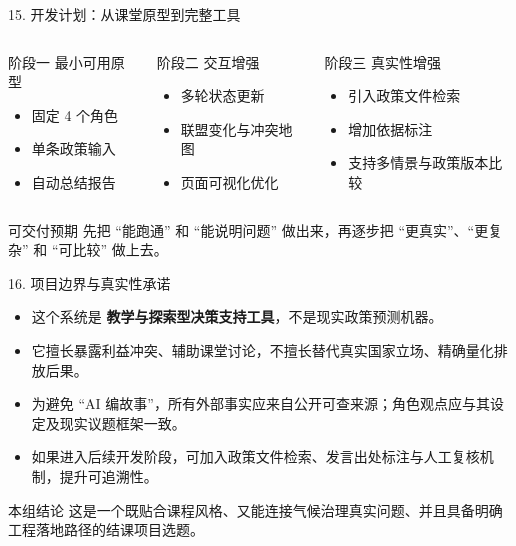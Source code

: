 \documentclass[aspectratio=169,10.5pt]{ctexbeamer}
\begin{document}
\begin{frame}{15. 开发计划：从课堂原型到完整工具}
  \begin{columns}[T]
    \begin{block}{阶段一}
      最小可用原型
      \begin{itemize}
        \item 固定 4 个角色
        \item 单条政策输入
        \item 自动总结报告
      \end{itemize}
    \end{block}
    \begin{block}{阶段二}
      交互增强
      \begin{itemize}
        \item 多轮状态更新
        \item 联盟变化与冲突地图
        \item 页面可视化优化
      \end{itemize}
    \end{block}
    \begin{block}{阶段三}
      真实性增强
      \begin{itemize}
        \item 引入政策文件检索
        \item 增加依据标注
        \item 支持多情景与政策版本比较
      \end{itemize}
    \end{block}
  \end{columns}
  \begin{alertblock}{可交付预期}
    先把 ``能跑通'' 和 ``能说明问题'' 做出来，再逐步把 ``更真实''、``更复杂'' 和 ``可比较'' 做上去。
  \end{alertblock}
\end{frame}

\begin{frame}{16. 项目边界与真实性承诺}
  \begin{itemize}
    \item 这个系统是 \textbf{教学与探索型决策支持工具}，不是现实政策预测机器。
    \item 它擅长暴露利益冲突、辅助课堂讨论，不擅长替代真实国家立场、精确量化排放后果。
    \item 为避免 ``AI 编故事''，所有外部事实应来自公开可查来源；角色观点应与其设定及现实议题框架一致。
    \item 如果进入后续开发阶段，可加入政策文件检索、发言出处标注与人工复核机制，提升可追溯性。
  \end{itemize}
  \begin{alertblock}{本组结论}
    这是一个既贴合课程风格、又能连接气候治理真实问题、并且具备明确工程落地路径的结课项目选题。
  \end{alertblock}
\end{frame}
\end{document}
